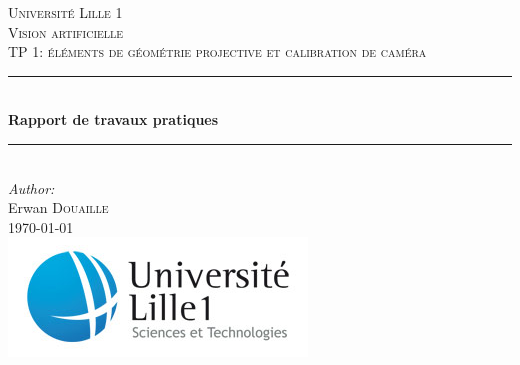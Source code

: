 \makeatletter

\begin{titlepage}

\newcommand{\HRule}{\rule{\linewidth}{0.5mm}} %

\center %
 

\textsc{\LARGE Université Lille 1}\\[1.5cm] %
\vspace{7em}
\textsc{\Large Vision artificielle}\\[0.5cm] %
\textsc{\large TP 1: éléments de géométrie projective et calibration de caméra}\\[0.5cm] %


\vspace{1em}
\HRule \\[0.4cm]
{ \huge \bfseries Rapport de travaux pratiques}\\[0.1cm] %
\HRule \\[2cm]
 

\Large \emph{Author:}\\
Erwan \textsc{Douaille}\\[1cm] %


{\large \today}\\[3cm] %


\includegraphics[scale=0.6]{image/ustl1.jpg}
 

\vfill %

\end{titlepage}
\makeatother

\sloppy